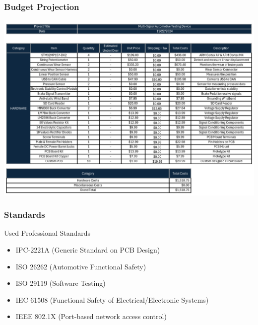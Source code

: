 \documentclass[8pt,compress,aspectratio=169]{beamer}
\begin{document}
\begin{frame}
  \frametitle{Budget Projection}
  \centering
  \includegraphics[height=0.80\paperheight]{assets/diagrams/budget.png}
\end{frame}

\begin{frame}
  \frametitle{Standards}
  \begin{block}{Used Professional Standards}
    \begin{itemize}
      \item IPC-2221A (Generic Standard on PCB Design)
      \item ISO 26262 (Automotive Functional Safety)
      \item ISO 29119 (Software Testing)
      \item IEC 61508 (Functional Safety of Electrical/Electronic Systems)
      \item IEEE 802.1X (Port-based network access control)

    \end{itemize}
  \end{block}
\end{frame}

\end{document}
